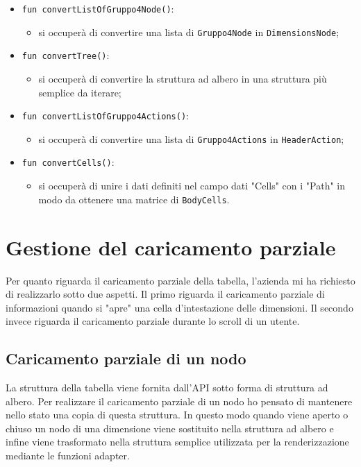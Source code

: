 \begin{itemize}
	\item \verb|fun convertListOfGruppo4Node()|:
	\begin{itemize}
		\item si occuperà di convertire una lista di \verb|Gruppo4Node| in \verb|DimensionsNode|;
	\end{itemize}

	\item \verb|fun convertTree()|:
	\begin{itemize}
		\item si occuperà di convertire la struttura ad albero in una struttura più semplice da iterare;
	\end{itemize}
	
	\item \verb|fun convertListOfGruppo4Actions()|:
	\begin{itemize}
		\item si occuperà di convertire una lista di \verb|Gruppo4Actions| in \verb|HeaderAction|;
	\end{itemize}

	\item \verb|fun convertCells()|:
	\begin{itemize}
		\item si occuperà di unire i dati definiti nel campo dati "Cells" con i "Path" in modo da ottenere una matrice di \verb|BodyCells|.
	\end{itemize}
\end{itemize}

\section{Gestione del caricamento parziale}
Per quanto riguarda il caricamento parziale della tabella, l'azienda mi ha richiesto di realizzarlo sotto due aspetti. Il primo riguarda il caricamento parziale di informazioni quando si "apre" una cella d'intestazione delle dimensioni. Il secondo invece riguarda il caricamento parziale durante lo scroll di un utente.

\subsection*{Caricamento parziale di un nodo}
La struttura della tabella viene fornita dall'API sotto forma di struttura ad albero. Per realizzare il caricamento parziale di un nodo ho pensato di mantenere nello stato una copia di questa struttura. In questo modo quando viene aperto o chiuso un nodo di una dimensione viene sostituito nella struttura ad albero e infine viene trasformato nella struttura semplice utilizzata per la renderizzazione mediante le funzioni adapter.

